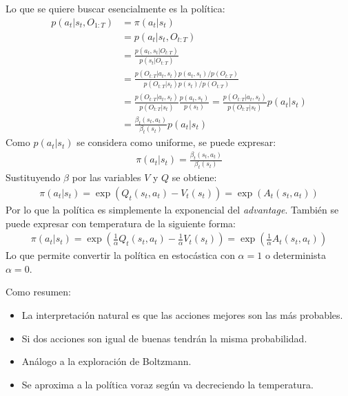 Lo que se quiere buscar esencialmente es la política:
\begin{align}
    p(a_t|s_t,O_{1:T})&=\pi(a_t|s_t)\\
                      &=p(a_t|s_t,O_{t:T})\\
                      &= \frac{p(a_t,s_t|O_{t:T})}{p(s_t|O_{t:T})} \\
                      &= \frac { p ( O _ { t : T } | a _ { t } , s _ { t } ) p ( a _ { t } , s _
                      { t } ) / p ( O _ { t : T } ) } { p ( O _ { t : T } | s _ { t } ) p ( s _ {
                  t } ) / p ( O _ { t : T } ) }\\
                      &= \frac { p ( O _ { t : T } | a _ { t } , s _ { t } ) } { p ( O _ { t : T
                      } | s _ { t } ) } \frac { p ( a _ { t } , s _ { t } ) } { p ( s _ { t } ) }
                      =  \frac { p ( O _ { t : T } | a _ { t } , s _ { t } ) } { p ( O _ { t : T
                      } | s _ { t } ) } p(a_t|s_t)\\
                      &= \frac{\beta_t(s_t,a_t)}{\beta_t(s_t)} p(a_t|s_t)
\end{align}
Como $p(a_t|s_t)$ se considera como uniforme, se puede expresar:
\begin{align}
    \pi(a_t|s_t) = \frac{\beta_t(s_t,a_t)}{\beta_t(s_t)}
\end{align}
Sustituyendo $\beta$ por las variables $V$ y $Q$ se obtiene:
\begin{align}
\pi ( a _ { t } | s _ { t } ) = \operatorname { exp } ( Q _ { t } ( s _ { t } , a _ { t } ) - V _ { t } ( s _ { t } ) ) = \operatorname { exp } ( A _ { t } ( s _ { t } , a _ { t } ) )
\end{align}
Por lo que la política es simplemente la exponencial del \textit{advantage}. También se puede
expresar con temperatura de la siguiente forma:
\begin{align}
\pi ( a _ { t } | s _ { t } ) = \operatorname { exp } ( \frac { 1 } { \alpha } Q _ { t } ( s _ { t } , a _ { t } ) - \frac { 1 } { \alpha } V _ { t } ( s _ { t } ) ) = \operatorname { exp } ( \frac { 1 } { \alpha } A _ { t } ( s _ { t } , a _ { t } ) )
\end{align}
Lo que permite convertir la política en estocástica con $\alpha=1$ o determinista
$\alpha=0$.

Como resumen:
 \begin{itemize}
    \item La interpretación natural es que las acciones mejores son las más probables.
    \item Si dos acciones son igual de buenas tendrán la misma probabilidad.
    \item Análogo a la exploración de Boltzmann.
    \item Se aproxima a la política voraz según va decreciendo la temperatura.
\end{itemize}

